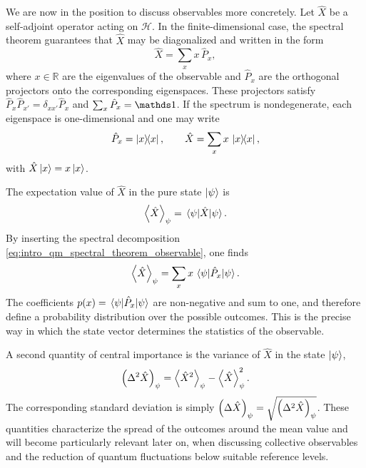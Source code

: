 We are now in the position to discuss observables more concretely. Let $\hat X$ be a self-adjoint operator acting on $\mathcal{H}$. In the finite-dimensional case, the spectral theorem guarantees that $\hat X$ may be diagonalized and written in the form
\begin{equation}
	\hat X=\sum_x x\,\hat P_x,
	\label{eq:intro_qm_spectral_theorem_observable}
\end{equation}
where $x\in\mathds{R}$ are the eigenvalues of the observable and $\hat P_x$ are the orthogonal projectors onto the corresponding eigenspaces. These projectors satisfy $\hat P_x\hat P_{x'}=\delta_{x x'}\hat P_x$ and $\sum_x \hat P_x=\id$. If the spectrum is nondegenerate, each eigenspace is one-dimensional and one may write
\begin{equation}
	\hat P_x=\dyad{x}{x},
	\qquad
	\hat X=\sum_x x\,\dyad{x}{x},
	\label{eq:intro_qm_nondegenerate_spectral_decomposition}
\end{equation}
with $\hat X\ket{x}=x\ket{x}$.

The expectation value of $\hat X$ in the pure state $\ket{\psi}$ is
\begin{equation}
	\expval{\hat X}_{\psi}
	=
	\matrixel{\psi}{\hat X}{\psi}.
	\label{eq:intro_qm_expectation_value_observable}
\end{equation}
By inserting the spectral decomposition \eqref{eq:intro_qm_spectral_theorem_observable}, one finds
\begin{equation}
	\expval{\hat X}_{\psi}
	=
	\sum_x x\,\matrixel{\psi}{\hat P_x}{\psi}.
	\label{eq:intro_qm_expectation_value_spectral}
\end{equation}
The coefficients $p(x)=\matrixel{\psi}{\hat P_x}{\psi}$ are non-negative and sum to one, and therefore define a probability distribution over the possible outcomes. This is the precise way in which the state vector determines the statistics of the observable.

A second quantity of central importance is the variance of $\hat X$ in the state $\ket{\psi}$,
\begin{equation}
	\Var[\psi]{\hat X}
	=
	\expval{\hat X^2}_{\psi}
	-
	\expval{\hat X}_{\psi}^2.
	\label{eq:intro_qm_variance_definition}
\end{equation}
The corresponding standard deviation is simply $\Std[\psi]{\hat X}=\sqrt{\Var[\psi]{\hat X}}$. These quantities characterize the spread of the outcomes around the mean value and will become particularly relevant later on, when discussing collective observables and the reduction of quantum fluctuations below suitable reference levels.

